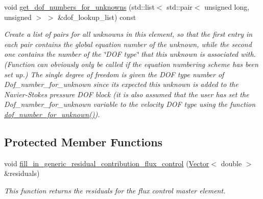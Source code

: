 \begin{DoxyCompactItemize}
void \hyperlink{classoomph_1_1NetFluxControlElement_ac4eedd635a016d29fd9e6da5ae0f8707}{get\+\_\+dof\+\_\+numbers\+\_\+for\+\_\+unknowns} (std\+::list$<$ std\+::pair$<$ unsigned long, unsigned $>$ $>$ \&dof\+\_\+lookup\+\_\+list) const
\begin{DoxyCompactList}\small\item\em Create a list of pairs for all unknowns in this element, so that the first entry in each pair contains the global equation number of the unknown, while the second one contains the number of the \char`\"{}\+D\+O\+F type\char`\"{} that this unknown is associated with. (Function can obviously only be called if the equation numbering scheme has been set up.) The single degree of freedom is given the D\+OF type number of Dof\+\_\+number\+\_\+for\+\_\+unknown since it\textquotesingle{}s expected this unknown is added to the Navier-\/\+Stokes pressure D\+OF block (it is also assumed that the user has set the Dof\+\_\+number\+\_\+for\+\_\+unknown variable to the velocity D\+OF type using the function \hyperlink{classoomph_1_1NetFluxControlElement_a43142408a4d2cea51b26d0c641bb0f51}{dof\+\_\+number\+\_\+for\+\_\+unknown()}). \end{DoxyCompactList}\end{DoxyCompactItemize}
\subsection*{Protected Member Functions}
\begin{DoxyCompactItemize}
\item 
void \hyperlink{classoomph_1_1NetFluxControlElement_a1904cdd012883add53cb41253d1effaf}{fill\+\_\+in\+\_\+generic\+\_\+residual\+\_\+contribution\+\_\+flux\+\_\+control} (\hyperlink{classoomph_1_1Vector}{Vector}$<$ double $>$ \&residuals)
\begin{DoxyCompactList}\small\item\em This function returns the residuals for the flux control master element. \end{DoxyCompactList}\end{DoxyCompactItemize}
